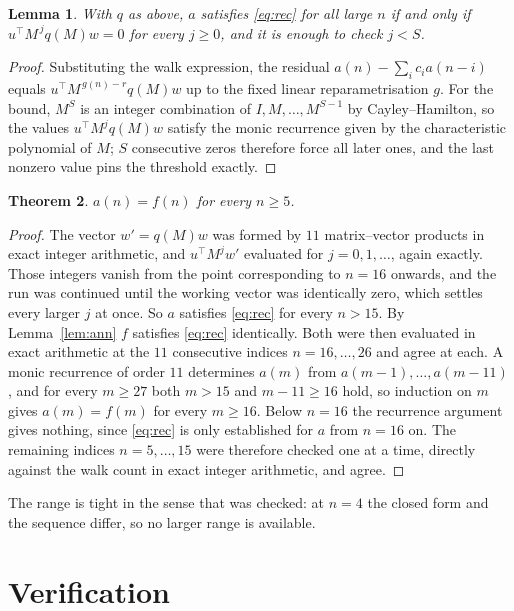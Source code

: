 \documentclass[11pt,a4paper]{article}
\theoremstyle{plain}
\newtheorem{theorem}{Theorem}
\newtheorem{lemma}[theorem]{Lemma}
\theoremstyle{definition}
\begin{document}
\begin{lemma}\label{lem:crit}
With $q$ as above, $a$ satisfies \eqref{eq:rec} for all large $n$ if and only if
$u^{\!\top}M^{\,j}q(M)w=0$ for every $j\ge0$, and it is enough to check $j<S$.
\end{lemma}

\begin{proof}
Substituting the walk expression, the residual $a(n)-\sum_ic_ia(n-i)$ equals
$u^{\!\top}M^{\,g(n)-r}q(M)w$ up to the fixed linear reparametrisation $g$. For the bound,
$M^{S}$ is an integer combination of $I,M,\dots,M^{S-1}$ by Cayley--Hamilton, so the values
$u^{\!\top}M^{j}q(M)w$ satisfy the monic recurrence given by the characteristic polynomial of
$M$; $S$ consecutive zeros therefore force all later ones, and the last nonzero value pins the
threshold exactly.
\end{proof}

\begin{theorem}
$a(n)=f(n)$ for every $n\ge5$.
\end{theorem}

\begin{proof}
The vector $w'=q(M)w$ was formed by $11$ matrix--vector products in exact integer
arithmetic, and $u^{\!\top}M^{j}w'$ evaluated for $j=0,1,\dots$, again exactly. Those integers
vanish from the point corresponding to $n=16$ onwards, and the run was continued until the
working vector was identically zero, which settles every larger $j$ at once. So $a$ satisfies
\eqref{eq:rec} for every $n>15$. By Lemma~\ref{lem:ann} $f$ satisfies \eqref{eq:rec}
identically. Both were then evaluated in exact arithmetic at the $11$ consecutive indices
$n=16,\dots,26$ and agree at each. A monic recurrence of order $11$
determines $a(m)$ from $a(m-1),\dots,a(m-11)$, and for every $m\ge27$ both
$m>15$ and $m-11\ge16$ hold, so induction on $m$ gives $a(m)=f(m)$ for every
$m\ge16$.
Below $n=16$ the recurrence argument gives nothing, since \eqref{eq:rec} is only
established for $a$ from $n=16$ on. The remaining indices $n=5,\dots,15$ were
therefore checked one at a time, directly against the walk count in exact integer arithmetic,
and agree.
\end{proof}

The range is tight in the sense that was checked: at $n=4$ the closed form and the sequence differ, so no larger range is available.

\section{Verification}
\end{document}
